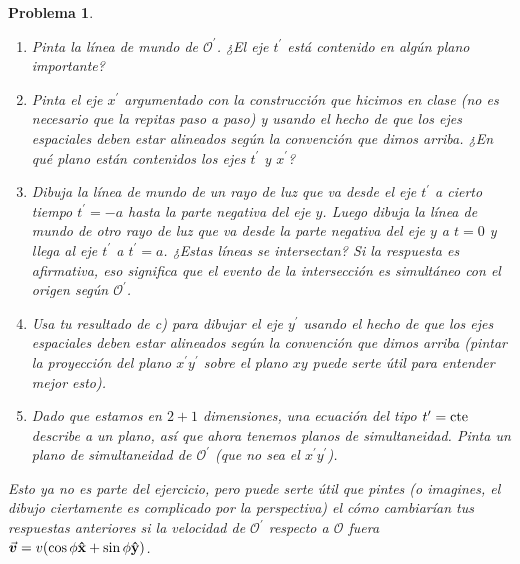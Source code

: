 \documentclass[12pt]{article}
\theoremstyle{break}
\newtheorem{exercise}{Problema}
\theoremstyle{nonumberbreak}
\DeclareRobustCommand{\uvec}[1]{{%
  \ifcsname uvec#1\endcsname
     \csname uvec#1\endcsname
   \else
    \bm{\hat{\mathbf{#1}}}%
   \fi
}}%
\newcommand*{\observer}{\mathcal{O}}
\newcommand*{\primeobserver}{\mathcal{O}^{\prime}}
\begin{document}
\begin{exercise}
        \begin{enumerate}[label = \alph*)]
            \item Pinta la línea de mundo de \(\primeobserver\). ¿El eje \(t^{\prime}\) está contenido en algún plano importante?
            \item Pinta el eje \(x^{\prime}\) argumentado con la construcción que hicimos en clase (no es necesario que la repitas paso a paso) y usando el hecho de que los ejes espaciales deben estar alineados según la convención que dimos arriba. ¿En qué plano están contenidos los ejes \(t^{\prime}\) y \(x^{\prime}\)?
            \item Dibuja la línea de mundo de un rayo de luz que va desde el eje \(t^{\prime}\) a cierto tiempo \(t^{\prime} = -a\) hasta la parte negativa del eje \(y\). Luego dibuja la línea de mundo de otro rayo de luz que va desde la parte negativa del eje \(y\) a \(t = 0\) y llega al eje \(t^{\prime}\) a \(t^{\prime} = a\). ¿Estas líneas se intersectan? Si la respuesta es afirmativa, eso significa que el evento de la intersección es simultáneo con el origen según \(\primeobserver\).
            \item Usa tu resultado de c) para dibujar el eje \(y^{\prime}\) usando el hecho de que los ejes espaciales deben estar alineados según la convención que dimos arriba (pintar la proyección del plano \(x^{\prime}y^{\prime}\) sobre el plano \(xy\) puede serte útil para entender mejor esto).
            \item Dado que estamos en \(2 + 1\) dimensiones, una ecuación del tipo \(t^{\prime} = \textnormal{cte}\) describe a un plano, así que ahora tenemos planos de simultaneidad. Pinta un plano de simultaneidad de \(\primeobserver\) (que no sea el \(x^{\prime}y^{\prime}\)).
        \end{enumerate}
        Esto ya no es parte del ejercicio, pero puede serte útil que pintes (o imagines, el dibujo ciertamente es complicado por la perspectiva) el cómo cambiarían tus respuestas anteriores si la velocidad de \(\primeobserver\) respecto a \(\observer\) fuera \(\va*{v} = v(\cos\phi\uvec{x} + \sin\phi\uvec{y})\).
    \end{exercise}
\end{document}
